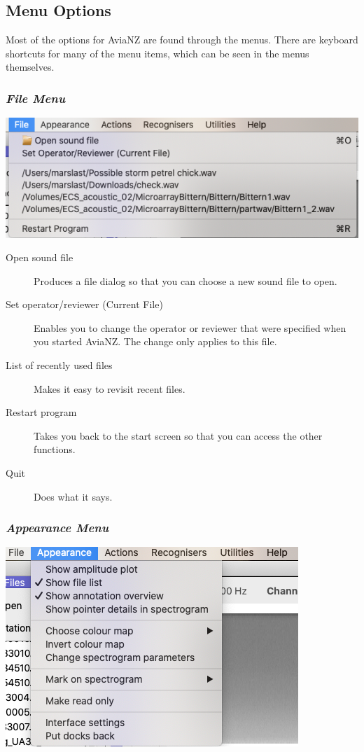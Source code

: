 \documentclass{article}
\begin{document}
\subsection{Menu Options}	

Most of the options for AviaNZ are found through the menus. There are keyboard shortcuts for many of the menu items, which can be seen in the menus themselves. 

\subsubsection{{\em File Menu}}

\begin{center}
\includegraphics[width=.7\textwidth]{Figures/FileMenu}
\end{center}

\begin{description}
\item[Open sound file] Produces a file dialog so that you can choose a new sound file to open.
\item[Set operator/reviewer (Current File)] Enables you to change the operator or reviewer that were specified when you started AviaNZ. The change only applies to this file. 
\item[List of recently used files] Makes it easy to revisit recent files.
\item[Restart program] Takes you back to the start screen so that you can access the other functions.
\item[Quit] Does what it says.
\end{description}

\subsubsection{{\em Appearance Menu}}

\begin{center}
\includegraphics[width=.5\textwidth]{Figures/AppearanceMenu}
\end{center}
\end{document}

